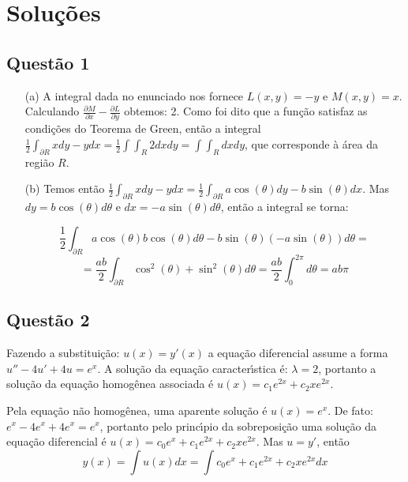 \section{\color{red} Solu\c c\~oes}

\subsection{\color{red} Quest\~ao 1}

\begin{enumerate}

\item[(a)] A integral dada no enunciado nos fornece $L(x,y)=-y$ e $M(x,y)=x$. Calculando $\displaystyle \frac{\partial M}{\partial x}-\frac{\partial L}{\partial y}$ obtemos: 2. Como foi dito que a fun\c c\~ao satisfaz as condi\c c\~oes do Teorema de Green, ent\~ao a integral $\displaystyle \frac1{2} \int_{\partial R} x dy - y dx=\displaystyle \frac1{2}\int\!\int_R 2 dx dy=\int\!\int_R dx dy$, que corresponde \`a \'area da regi\~ao $R$.

\item[(b)] Temos ent\~ao $\displaystyle \frac1{2} \int_{\partial R} x dy - y dx=\frac1{2} \int_{\partial R} a\cos(\theta) dy-b\sin(\theta) dx$. Mas $dy=b \cos(\theta)d\theta$ e $dx=-a \sin(\theta) d\theta$, ent\~ao a integral se torna: 

$$\frac1{2} \int_{\partial R} a\cos(\theta) b \cos(\theta)d\theta-b\sin(\theta) (-a \sin(\theta)) d\theta=$$ $$=\frac{ab}{2} \int_{\partial R}\cos^2(\theta)+\sin^2(\theta) d\theta=\frac{ab}{2}\int_0^{2\pi} d\theta=ab\pi$$

\end{enumerate}

\subsection{\color{red} Quest\~ao 2}

Fazendo a substitui\c c\~ao: $u(x)=y'(x)$ a equa\c c\~ao diferencial assume a forma $u''-4u'+4u=e^x$. A solu\c c\~ao da equa\c c\~ao caracter\'\i stica \'e: $\lambda=2$, portanto a solu\c c\~ao da equa\c c\~ao homog\^enea associada \'e $u(x)=c_1e^{2x}+c_2xe^{2x}$.

Pela equa\c c\~ao n\~ao homog\^enea, uma aparente solu\c c\~ao \'e $u(x)=e^x$. De fato: $e^x-4e^x+4e^x=e^x$, portanto pelo princ\'\i pio da sobreposi\c c\~ao uma solu\c c\~ao da equa\c c\~ao diferencial \'e $u(x)=c_0e^x+c_1e^{2x}+c_2xe^{2x}$. Mas $u=y'$, ent\~ao $$y(x)=\int u(x) dx=\int c_0e^x+c_1e^{2x}+c_2xe^{2x}dx$$

